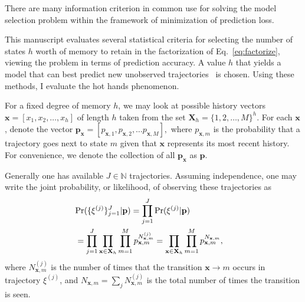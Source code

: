 \documentclass{IOS-Book-Article}
\newcommand{\bx}{\mathbf{x}}
\newcommand{\bp}{\mathbf{p}}
\begin{document}
There are many information criterion in common use for solving the model selection problem within the framework of minimization of prediction loss.

This manuscript evaluates several statistical criteria for selecting the number of states $h$ worth of memory to retain in the factorization of Eq.~\ref{eq:factorize}, viewing the problem in terms of prediction accuracy. 
A value $h$ that yields a model that can best predict new unobserved trajectories~\cite{claeskens2008model} is chosen. Using these methods, I evaluate the hot hands phenomenon.

 For a fixed degree of memory $h$,
we may look at possible history vectors $\bx = [x_1,x_2,\ldots,x_h]$ of length $h$ taken from the set $\mathbf{X}_h = \{1,2,\ldots,M \}^h$. For each $\bx$, denote the vector $\mathbf{p}_{\bx} = [p_{\bx,1},p_{\bx,2},\ldots{p}_{\bx,M}],$ where $p_{\bx,m}$ is the probability that a trajectory goes next to state $m$ given that $\bx$ represents its most recent history. For convenience, we denote the collection of all $\bp_\bx$ as $\mathbf{p}$.  

Generally one has available  $J\in\mathbb{N}$ trajectories. Assuming independence, one may write the joint probability, or likelihood, of observing these trajectories as
\begin{align}
\lefteqn{\Pr(\{\xi^{(j)} \}_{j=1}^J \vert \bp) = \prod_{j=1}^J \Pr(\xi^{(j)}\vert \bp)  } \nonumber\\
&= \prod_{j=1}^J \prod_{\bx\in\mathbf{X}_h} \prod_{m=1}^M p_{\bx,m}^{N^{(j)}_{\bx,m}} = \prod_{\bx\in\mathbf{X}_h} \prod_{m=1}^M p_{\bx,m}^{N_{\bx,m}} ,
\label{eq:likelihood}
\end{align}
where $N^{(j)}_{\bx,m}$ is the number of times that the transition $\bx\to m$ occurs in trajectory $\xi^{(j)}$, and $N_{\bx,m} = \sum_j N^{(j)}_{\bx,m}$ is the total number of times the transition is seen.%
\end{document}
